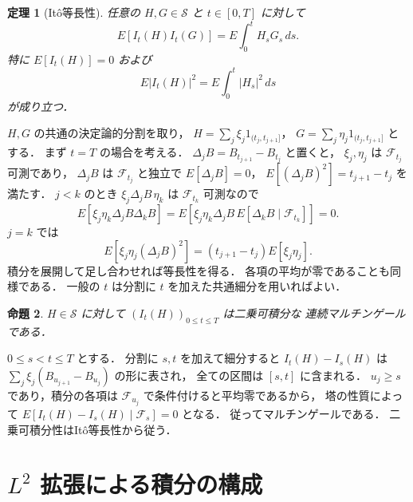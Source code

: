 \documentclass[a5paper,10pt,onecolumn]{jsarticle}
\makeatletter
\theoremstyle{mathnotetheorem}
\newtheorem{theorem}{定理}[section]
\newtheorem{proposition}[theorem]{命題}
\renewcommand{\proofname}{証明}
\renewenvironment{proof}[1][\proofname]{%
  \par\pushQED{\qed}\normalfont\topsep4\p@\@plus2\p@\relax
  \trivlist\item[\hskip\labelsep\bfseries #1]\ignorespaces
}{\popQED\endtrivlist\@endpefalse}
\makeatother
\begin{document}
\begin{theorem}[It\^o等長性]\label{thm:isometry}
任意の $H,G\in\mathcal S$ と $t\in[0,T]$ に対して
\[
 E[I_t(H)I_t(G)]
 =E\int_0^tH_sG_s\,ds.
\]
特に $E[I_t(H)]=0$ および
\[
 E|I_t(H)|^2=E\int_0^t|H_s|^2\,ds
\]
が成り立つ．
\end{theorem}
\begin{proof}
$H,G$ の共通の決定論的分割を取り，
$H=\sum_j\xi_j1_{(t_j,t_{j+1}]}$，
$G=\sum_j\eta_j1_{(t_j,t_{j+1}]}$ とする．
まず $t=T$ の場合を考える．
$\Delta_jB=B_{t_{j+1}}-B_{t_j}$ と置くと，
$\xi_j,\eta_j$ は $\mathcal F_{t_j}$ 可測であり，
$\Delta_jB$ は $\mathcal F_{t_j}$ と独立で
$E[\Delta_jB]=0$，
$E[(\Delta_jB)^2]=t_{j+1}-t_j$ を満たす．
$j<k$ のとき
$\xi_j\Delta_jB\,\eta_k$ は $\mathcal F_{t_k}$ 可測なので
\[
 E[\xi_j\eta_k\Delta_jB\Delta_kB]
 =E[\xi_j\eta_k\Delta_jB\,
     E[\Delta_kB\mid\mathcal F_{t_k}]]=0.
\]
$j=k$ では
\[
 E[\xi_j\eta_j(\Delta_jB)^2]
 =(t_{j+1}-t_j)E[\xi_j\eta_j].
\]
積分を展開して足し合わせれば等長性を得る．
各項の平均が零であることも同様である．
一般の $t$ は分割に $t$ を加えた共通細分を用いればよい．
\end{proof}

\begin{proposition}\label{prop:simple-mart}
$H\in\mathcal S$ に対して
$(I_t(H))_{0\le t\le T}$ は二乗可積分な
連続マルチンゲールである．
\end{proposition}
\begin{proof}
$0\le s<t\le T$ とする．
分割に $s,t$ を加えて細分すると
$I_t(H)-I_s(H)$ は
$\sum_j\xi_j(B_{u_{j+1}}-B_{u_j})$ の形に表され，
全ての区間は $[s,t]$ に含まれる．
$u_j\ge s$ であり，積分の各項は
$\mathcal F_{u_j}$ で条件付けると平均零であるから，
塔の性質によって
$E[I_t(H)-I_s(H)\mid\mathcal F_s]=0$ となる．
従ってマルチンゲールである．
二乗可積分性はIt\^o等長性から従う．
\end{proof}

\section{$L^2$ 拡張による積分の構成}
\end{document}

